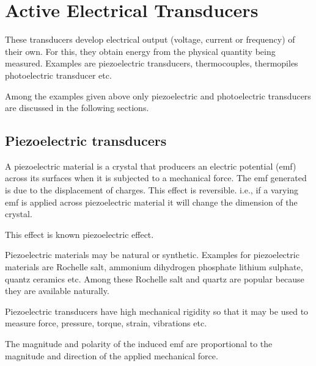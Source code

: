 \section{Active Electrical Transducers}\label{sec9.7}

These transducers develop electrical output (voltage, current or
frequency) of their own. For this, they obtain energy from the
physical quantity being measured. Examples are piezoelectric
transducers, thermocouples, thermopiles photoelectric transducer etc.

Among the examples given above only piezoelectric and photoelectric
transducers are discussed in the following sections.

\subsection{Piezoelectric transducers}\label{sec9.7.1}

A piezoelectric material is a crystal that producers an electric
potential (emf) across its surfaces when it is subjected to a
mechanical force. The emf generated is due to the displacement of
charges. This effect is reversible. i.e., if a varying  emf is applied
across piezoelectric  material it will change the dimension of the
crystal.

This effect is known piezoelectric effect.

Piezoelectric materials may be natural or synthetic. Examples for
piezoelectric materials are Rochelle salt, ammonium dihydrogen
phosphate lithium sulphate, quantz ceramics etc. Among these Rochelle
salt and quartz are popular because they are available naturally.

Piezoelectric transducers have high mechanical rigidity so that it may
be used to measure force, pressure, torque, strain, vibrations etc.

The magnitude and polarity of the induced emf are proportional to the
magnitude and direction of the applied mechanical force.

